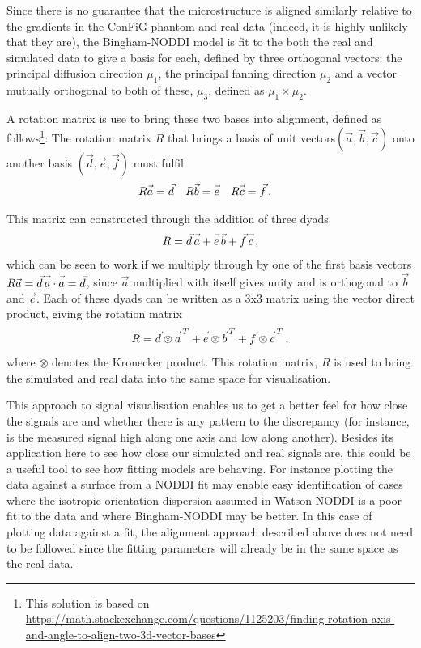 Since there is no guarantee that the microstructure is aligned similarly relative to the gradients in the \ac{ConFiG} phantom and real data (indeed, it is highly unlikely that they are), the Bingham-NODDI model \cite{Tariq2016} is fit to the both the real and simulated data to give a basis for each, defined by three orthogonal vectors: the principal diffusion direction $\mu_1$, the principal fanning direction $\mu_2$ and a vector mutually orthogonal to both of these, $\mu_3$, defined as $\mu_1 \times \mu_2$.

A rotation matrix is use to bring these two bases into alignment, defined as follows\footnote{This solution is based on \url{https://math.stackexchange.com/questions/1125203/finding-rotation-axis-and-angle-to-align-two-3d-vector-bases}}: The rotation matrix $R$ that brings a basis of unit vectors$(\vec{a}, \vec{b}, \vec{c})$ onto another basis $(\vec{d}, \vec{e}, \vec{f})$ must fulfil
\begin{align}
R\vec{\vphantom{t}a} &= \vec{d} & R\vec{b} &= \vec{\vphantom{t}e} & R\vec{\vphantom{t}c} &= \vec{f}\,.
\end{align}

This matrix can constructed through the addition of three dyads
\begin{equation}
  R = \vec{d}\,\vec{\vphantom{f}a} + \vec{\vphantom{f}e}\,\vec{b} + \vec{f}\,\vec{\vphantom{f}c} \,,
\end{equation}
which can be seen to work if we multiply through by one of the first basis vectors $R\vec{a} = \vec{d}\,\vec{\vphantom{f}a}\cdot\vec{\vphantom{f}a} = \vec{d}$, since $\vec{a}$ multiplied with itself gives unity and is orthogonal to $\vec{b}$ and $\vec{c}$.
Each of these dyads can be written as a 3x3 matrix using the vector direct product, giving the rotation matrix
\begin{equation}
R = \vec{d} \otimes \vec{\vphantom{f}a}^{\,T} + \vec{\vphantom{f}e} \otimes \vec{\vphantom{f}b}^{\,T} + \vec{f} \otimes \vec{\vphantom{f}c}^{\,T}\,,
\end{equation}
where $\otimes$ denotes the Kronecker product. This rotation matrix, $R$ is used to bring the simulated and real data into the same space for visualisation.


This approach to signal visualisation enables us to get a better feel for how close the signals are and whether there is any pattern to the discrepancy (for instance, is the measured signal high along one axis and low along another).
Besides its application here to see how close our simulated and real signals are, this could be a useful tool to see how fitting models are behaving. For instance plotting the data against a surface from a \ac{NODDI} fit may enable easy identification of cases where the isotropic orientation dispersion assumed in Watson-NODDI is a poor fit to the data and where Bingham-NODDI \cite{Tariq2016} may be better.
In this case of plotting data against a fit, the alignment approach described above does not need to be followed since the fitting parameters will already be in the same space as the real data.


